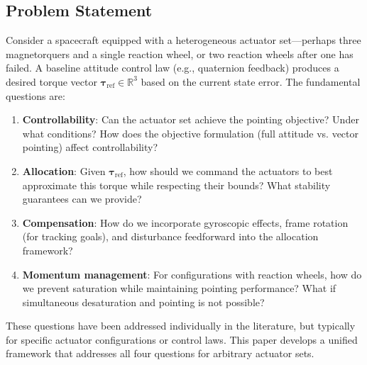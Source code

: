 \documentclass[conference]{IEEEtran}
\begin{document}
\subsection{Problem Statement}
Consider a spacecraft equipped with a heterogeneous actuator set---perhaps three magnetorquers and a single reaction wheel, or two reaction wheels after one has failed. A baseline attitude control law (e.g., quaternion feedback) produces a desired torque vector $\boldsymbol{\tau}_{\text{ref}} \in \mathbb{R}^3$ based on the current state error. The fundamental questions are:

\begin{enumerate}
    \item \textbf{Controllability}: Can the actuator set achieve the pointing objective? Under what conditions? How does the objective formulation (full attitude vs. vector pointing) affect controllability?
    \item \textbf{Allocation}: Given $\boldsymbol{\tau}_{\text{ref}}$, how should we command the actuators to best approximate this torque while respecting their bounds? What stability guarantees can we provide?
    \item \textbf{Compensation}: How do we incorporate gyroscopic effects, frame rotation (for tracking goals), and disturbance feedforward into the allocation framework?
    \item \textbf{Momentum management}: For configurations with reaction wheels, how do we prevent saturation while maintaining pointing performance? What if simultaneous desaturation and pointing is not possible?
\end{enumerate}

These questions have been addressed individually in the literature, but typically for specific actuator configurations or control laws. This paper develops a unified framework that addresses all four questions for arbitrary actuator sets.
\end{document}
